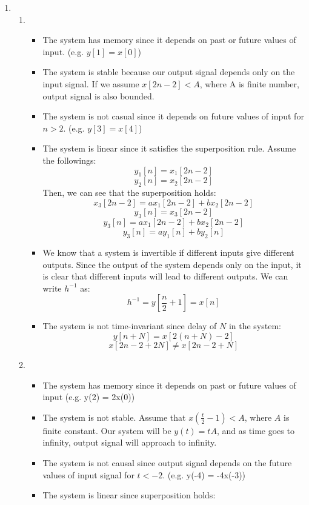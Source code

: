 \documentclass[10pt,a4paper, margin=1in]{article}
\begin{document}
\begin{enumerate}
\item %
    \begin{enumerate}
    \item 
    \begin{itemize}
        \item The system has memory since it depends on past or future values of input. (e.g. $y[1] = x[0]$)
        \item The system is stable because our output signal depends only on the input signal. If we assume $x[2n-2] < A$, where A is finite number, output signal is also bounded.
        \item The system is not casual since it depends on future values of input for $n>2$. (e.g. $y[3] = x[4]$)
        \item The system is linear since it satisfies the superposition rule. Assume the followings:
        \[y_1[n] = x_1[2n-2]\]
        \[y_2[n] = x_2[2n-2]\]
        Then, we can see that the superposition holds:
        \[x_3[2n-2] = ax_1[2n-2] + bx_2[2n-2]\]
        \[y_3[n] = x_3[2n-2]\]
        \[y_3[n] = ax_1[2n-2] + bx_2[2n-2]\]
        \[y_3[n] = ay_1[n] + by_2[n]\]
        \item We know that a system is invertible if different inputs give different outputs. Since the output of the system depends only on the input, it is clear that different inputs will lead to different outputs. We can write $h^{-1}$ as:
        \[h^{-1} = y[\frac{n}{2} + 1] = x[n]\]
        \item The system is not time-invariant since delay of $N$ in the system:
        \[y[n + N] = x[2(n +N) -2]\]
        \[x[2n -2 + 2N] \neq x[2n-2 + N]\]
    \end{itemize}
    \item 
    \begin{itemize}
        \item The system has memory since it depends on past or future values of input (e.g. y(2) = 2x(0))
        \item The system is not stable. Assume that $x(\frac{t}{2} -1) < A$, where $A$ is finite constant. Our system will be $y(t) = tA$, and as time goes to infinity, output signal will approach to infinity.
        \item The system is not causal since output signal depends on the future values of input signal for $t < -2$. (e.g. y(-4) = -4x(-3))
        \item The system is linear since superposition holds:

\end{itemize}
\end{enumerate}
\end{enumerate}
\end{document}
